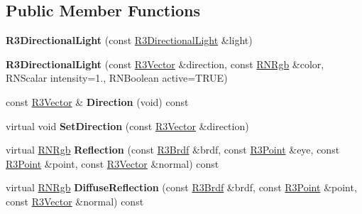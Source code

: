 \subsection*{Public Member Functions}
\begin{DoxyCompactItemize}
\item 
{\bfseries R3\+Directional\+Light} (const \hyperlink{class_r3_directional_light}{R3\+Directional\+Light} \&light)\hypertarget{class_r3_directional_light_a3e6d46f777599f81aac7ae38e0c07e5e}{}\label{class_r3_directional_light_a3e6d46f777599f81aac7ae38e0c07e5e}

\item 
{\bfseries R3\+Directional\+Light} (const \hyperlink{class_r3_vector}{R3\+Vector} \&direction, const \hyperlink{class_r_n_rgb}{R\+N\+Rgb} \&color, R\+N\+Scalar intensity=1., R\+N\+Boolean active=T\+R\+UE)\hypertarget{class_r3_directional_light_a79bb3a777e09a75d15b0132f3b31f749}{}\label{class_r3_directional_light_a79bb3a777e09a75d15b0132f3b31f749}

\item 
const \hyperlink{class_r3_vector}{R3\+Vector} \& {\bfseries Direction} (void) const \hypertarget{class_r3_directional_light_a3fb1dccde87ac9a7fded9b4c217ae9c3}{}\label{class_r3_directional_light_a3fb1dccde87ac9a7fded9b4c217ae9c3}

\item 
virtual void {\bfseries Set\+Direction} (const \hyperlink{class_r3_vector}{R3\+Vector} \&direction)\hypertarget{class_r3_directional_light_a1f7a22adaf5c48af06b4fd2c985c6a14}{}\label{class_r3_directional_light_a1f7a22adaf5c48af06b4fd2c985c6a14}

\item 
virtual \hyperlink{class_r_n_rgb}{R\+N\+Rgb} {\bfseries Reflection} (const \hyperlink{class_r3_brdf}{R3\+Brdf} \&brdf, const \hyperlink{class_r3_point}{R3\+Point} \&eye, const \hyperlink{class_r3_point}{R3\+Point} \&point, const \hyperlink{class_r3_vector}{R3\+Vector} \&normal) const \hypertarget{class_r3_directional_light_a3da3213d3fd501ede4401268668ef21e}{}\label{class_r3_directional_light_a3da3213d3fd501ede4401268668ef21e}

\item 
virtual \hyperlink{class_r_n_rgb}{R\+N\+Rgb} {\bfseries Diffuse\+Reflection} (const \hyperlink{class_r3_brdf}{R3\+Brdf} \&brdf, const \hyperlink{class_r3_point}{R3\+Point} \&point, const \hyperlink{class_r3_vector}{R3\+Vector} \&normal) const \hypertarget{class_r3_directional_light_ac415af4ae765d59535cddd842df422ab}{}\label{class_r3_directional_light_ac415af4ae765d59535cddd842df422ab}


\end{DoxyCompactItemize}

